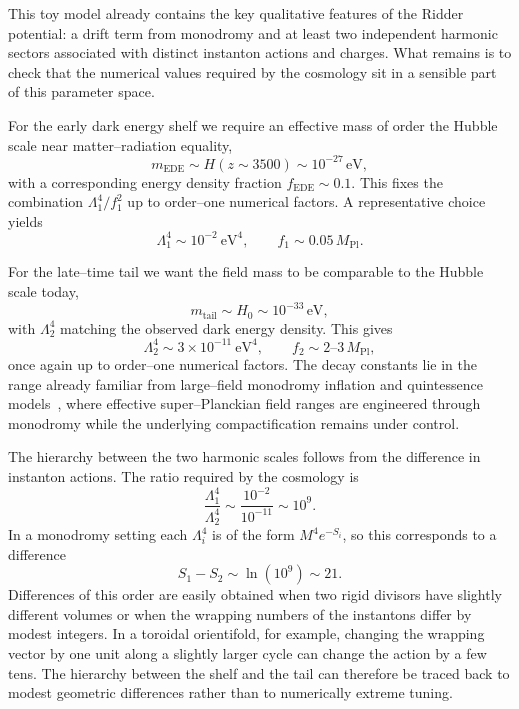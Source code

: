 \documentclass[a4paper,11pt]{article}
\begin{document}
This toy model already contains the key qualitative features of the Ridder potential: a drift term from monodromy and at least two independent harmonic sectors associated with distinct instanton actions and charges. What remains is to check that the numerical values required by the cosmology sit in a sensible part of this parameter space.

For the early dark energy shelf we require an effective mass of order the Hubble scale near matter–radiation equality,
\begin{equation}
    m_{\text{EDE}} \sim H(z \sim 3500) \sim 10^{-27}\,\text{eV},
\end{equation}
with a corresponding energy density fraction $f_{\text{EDE}} \sim 0.1$. This fixes the combination $\Lambda_1^4 / f_1^2$ up to order–one numerical factors. A representative choice yields
\begin{equation}
    \Lambda_1^4 \sim 10^{-2}~\text{eV}^4, \qquad f_1 \sim 0.05\,M_{\text{Pl}}.
\end{equation}

For the late–time tail we want the field mass to be comparable to the Hubble scale today,
\begin{equation}
    m_{\text{tail}} \sim H_0 \sim 10^{-33}\,\text{eV},
\end{equation}
with $\Lambda_2^4$ matching the observed dark energy density. This gives
\begin{equation}
    \Lambda_2^4 \sim 3 \times 10^{-11}~\text{eV}^4, \qquad f_2 \sim 2\text{--}3\,M_{\text{Pl}},
\end{equation}
once again up to order–one numerical factors. The decay constants lie in the range already familiar from large–field monodromy inflation and quintessence models~\cite{Baumann_McAllister}, where effective super–Planckian field ranges are engineered through monodromy while the underlying compactification remains under control.

The hierarchy between the two harmonic scales follows from the difference in instanton actions. The ratio required by the cosmology is
\begin{equation}
    \frac{\Lambda_1^4}{\Lambda_2^4} \sim \frac{10^{-2}}{10^{-11}} \sim 10^{9}.
\end{equation}
In a monodromy setting each $\Lambda_i^4$ is of the form $M^4 e^{-S_i}$, so this corresponds to a difference
\begin{equation}
    S_1 - S_2 \sim \ln(10^{9}) \sim 21.
\end{equation}
Differences of this order are easily obtained when two rigid divisors have slightly different volumes or when the wrapping numbers of the instantons differ by modest integers. In a toroidal orientifold, for example, changing the wrapping vector by one unit along a slightly larger cycle can change the action by a few tens. The hierarchy between the shelf and the tail can therefore be traced back to modest geometric differences rather than to numerically extreme tuning.
\end{document}
